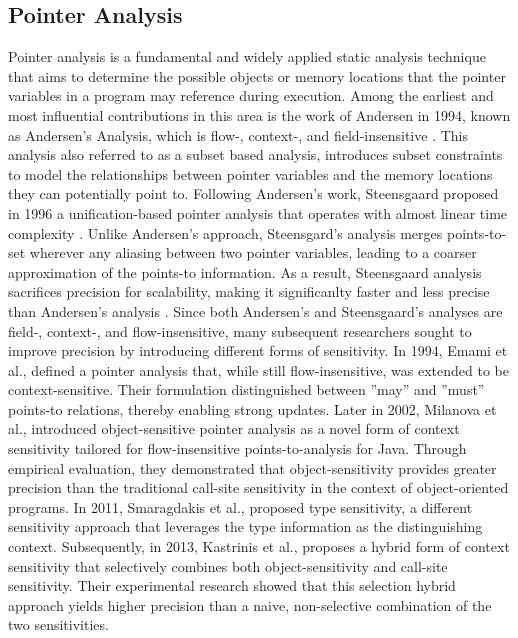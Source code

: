 \subsection{Pointer Analysis}

Pointer analysis is a fundamental and widely applied static analysis technique that aims to determine the possible objects or memory locations that the pointer variables in a program may reference during execution.
Among the earliest and most influential contributions in this area is the work of Andersen in 1994, known as Andersen's Analysis, which is flow-, context-, and field-insensitive \cite{andersen1994program}. 
This analysis also referred to as a subset based analysis, introduces subset constraints to model the relationships between pointer variables and the memory locations they can potentially point to. 
Following Andersen's work, Steensgaard proposed in 1996 a unification-based pointer analysis that operates with almost linear time complexity \cite{steensgaard1996points}.
Unlike Andersen's approach, Steensgard's analysis merges points-to-set wherever any aliasing between two pointer variables, leading to a coarser approximation of the points-to information. 
As a result, Steensgaard analysis sacrifices precision for scalability, making it significanlty faster and less precise than Andersen's analysis \cite{shapiro1997effects}.
Since both Andersen's and Steensgaard's analyses are field-, context-, and flow-insensitive, many subsequent researchers sought to improve precision by introducing different forms of sensitivity.
In 1994, Emami et al., \cite{emami1994context} defined a pointer analysis that, while still flow-insensitive, was extended to be context-sensitive. 
Their formulation distinguished between ''may'' and ''must'' points-to relations, thereby enabling strong updates.
Later in 2002, Milanova et al., \cite{milanova2002parameterized} introduced object-sensitive pointer analysis as a novel form of context sensitivity tailored for flow-insensitive points-to-analysis for Java.
Through empirical evaluation, they demonstrated that object-sensitivity provides greater precision than the traditional call-site sensitivity in the context of object-oriented programs.
In 2011, Smaragdakis et al., \cite{smaragdakis2011pick} proposed type sensitivity, a different sensitivity approach that leverages the type information as the distinguishing context.
Subsequently, in 2013, Kastrinis et al., \cite{kastrinis2013hybrid} proposes a hybrid form of context sensitivity that selectively combines both object-sensitivity and call-site sensitivity.
Their experimental research showed that this selection hybrid approach yields higher precision than a naive, non-selective combination of the two sensitivities.

